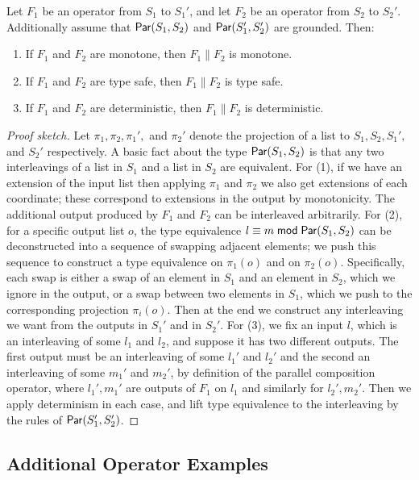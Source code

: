 \begin{proposition}
\label{prop:compositionaly-laws-additional}
Let $F_1$ be an operator from $S_1$ to $S_1'$, and let $F_2$ be an operator from $S_2$ to $S_2'$.
Additionally assume that $\mathsf{Par}({S_1}, {S_2})$ and $\mathsf{Par}({S_1'}, {S_2'})$ are grounded.
Then:
\begin{enumerate}
  \item If $F_1$ and $F_2$ are monotone, then $F_1 \| F_2$ is monotone.
  \item If $F_1$ and $F_2$ are type safe, then $F_1 \| F_2$ is type safe.
  \item If $F_1$ and $F_2$ are deterministic, then $F_1 \| F_2$ is deterministic.
\end{enumerate}
\end{proposition}
\begin{proof}[Proof sketch]
Let $\pi_1, \pi_2, \pi_1',$ and $\pi_2'$ denote the projection of a list to $S_1, S_2, S_1',$ and $S_2'$ respectively.
A basic fact about the type $\mathsf{Par}({S_1}, {S_2})$ is that any two interleavings of a list in $S_1$ and a list in $S_2$ are equivalent.
For (1), if we have an extension of the input list then applying $\pi_1$ and $\pi_2$ we also get extensions of each coordinate; these correspond to extensions in the output by monotonicity. The additional output produced by $F_1$ and $F_2$ can be interleaved arbitrarily.
For (2), for a specific output list $o$, the type equivalence $l \equiv m \;\mathsf{mod}\; {\mathsf{Par}({S_1}, {S_2})}$
can be deconstructed into a sequence of swapping adjacent elements; we push this sequence to construct a type equivalence on $\pi_1(o)$ and on $\pi_2(o)$. Specifically, each swap is either a swap of an element in $S_1$ and an element in $S_2$, which we ignore in the output, or a swap between two elements in $S_1$, which we push to the corresponding projection $\pi_i(o)$.
Then at the end we construct any interleaving we want from the outputs in $S_1'$ and in $S_2'$.
For (3), we fix an input $l$, which is an interleaving of some $l_1$ and $l_2$,
and suppose it has two different outputs.
The first output must be an interleaving of some $l_1'$ and $l_2'$ and the second an interleaving of some $m_1'$ and $m_2'$, by definition of the parallel composition operator, where $l_1', m_1'$ are outputs of $F_1$ on $l_1$ and similarly for $l_2', m_2'$. Then we apply determinism in each case, and lift type equivalence to the interleaving by the rules of $\mathsf{Par}({S_1'}, {S_2'})$.
\end{proof}

\subsection{Additional Operator Examples}
\label{sec:outtakes-examples}

